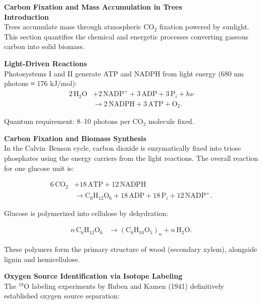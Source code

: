 \begin{technical}
{\Large\textbf{Carbon Fixation and Mass Accumulation in Trees}}\\[0.7em]

\noindent\textbf{Introduction}\\[0.5em]
Trees accumulate mass through atmospheric $\mathrm{CO}_2$ fixation powered by sunlight. This section quantifies the chemical and energetic processes converting gaseous carbon into solid biomass.

\noindent\textbf{Light-Driven Reactions}\\[0.5em]
Photosystems I and II generate ATP and NADPH from light energy (680 nm photons ≈ 176 kJ/mol):
\begin{align}
2\,\mathrm{H}_2\mathrm{O} 
&+ 2\,\mathrm{NADP}^+ 
+ 3\,\mathrm{ADP} 
+ 3\,\mathrm{P}_i 
+ h\nu \nonumber \\
&\rightarrow 2\,\mathrm{NADPH} 
+ 3\,\mathrm{ATP} 
+ \mathrm{O}_2.
\end{align}

Quantum requirement: 8–10 photons per $\mathrm{CO}_2$ molecule fixed.

\noindent\textbf{Carbon Fixation and Biomass Synthesis}\\[0.5em]
In the Calvin–Benson cycle, carbon dioxide is enzymatically fixed into triose phosphates using the energy carriers from the light reactions. The overall reaction for one glucose unit is:

\begin{align}
6\,\mathrm{CO}_2 
&+ 18\,\mathrm{ATP} 
+ 12\,\mathrm{NADPH} \nonumber \\
&\rightarrow \mathrm{C}_6\mathrm{H}_{12}\mathrm{O}_6 
+ 18\,\mathrm{ADP} 
+ 18\,\mathrm{P}_i 
+ 12\,\mathrm{NADP}^+.
\end{align}

Glucose is polymerized into cellulose by dehydration:

\begin{align}
n\,\mathrm{C}_6\mathrm{H}_{12}\mathrm{O}_6 
&\rightarrow (\mathrm{C}_6\mathrm{H}_{10}\mathrm{O}_5)_n 
+ n\,\mathrm{H}_2\mathrm{O}.
\end{align}

These polymers form the primary structure of wood (secondary xylem), alongside lignin and hemicellulose.

\noindent\textbf{Oxygen Source Identification via Isotope Labeling}\\[0.5em]
The $^{18}\mathrm{O}$ labeling experiments by Ruben and Kamen (1941) definitively established oxygen source separation:


\end{technical}
